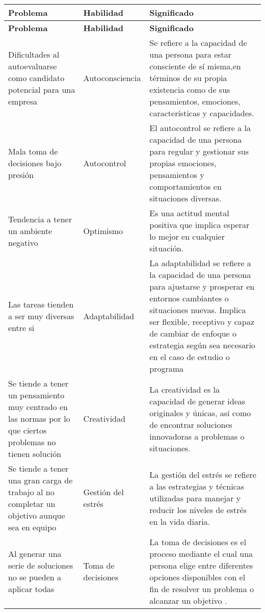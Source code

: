 \begin{longtable}{|p{6cm}|p{3cm}|p{8cm}|}
\hline
\textbf{Problema}  & \textbf{Habilidad} & \textbf{Significado}  \\ 
\hline
\endfirsthead
\hline
\textbf{Problema}  & \textbf{Habilidad} & \textbf{Significado}  \\ 
\hline
\endhead
\hline
\endfoot

Dificultades al autoevaluarse como candidato potencial para una empresa & Autoconsciencia & Se refiere a la capacidad de una persona para estar consciente de sí misma,en términos de su propia existencia como de sus pensamientos, emociones, características y capacidades.

 \\ 
 \hline
Mala toma de decisiones bajo presión
&
Autocontrol
 & 
El autocontrol se refiere a la capacidad de una persona para regular y gestionar sus propias emociones, pensamientos y comportamientos en situaciones diversas. 

\\ 
 \hline
Tendencia a tener un ambiente negativo
&
Optimismo
 & 
Es una actitud mental positiva que implica esperar lo mejor en cualquier situación. 

\\ 
\hline
Las tareas tienden a ser muy diversas entre si
&
Adaptabilidad
 & 
La adaptabilidad se refiere a la capacidad de una persona para ajustarse y prosperar en entornos cambiantes o situaciones nuevas. Implica ser flexible, receptivo y capaz de cambiar de enfoque o estrategia según sea necesario en el caso de estudio o programa
\\ 
\hline

Se tiende a tener un pensamiento muy centrado en las normas por lo que ciertos problemas no tienen solución

&
Creatividad
 & 
La creatividad es la capacidad de generar ideas originales y únicas, así como de encontrar soluciones innovadoras a problemas o situaciones.


\\
\hline
Se tiende a tener una gran carga de trabajo al no completar un objetivo aunque sea en equipo
&
Gestión del estrés
 & 
La gestión del estrés se refiere a las estrategias y técnicas utilizadas para manejar y reducir los niveles de estrés en la vida diaria.

\\
\hline
Al generar una serie de soluciones no se pueden a aplicar todas

&
 Toma de decisiones & 
La toma de decisiones es el proceso mediante el cual una persona elige entre diferentes opciones disponibles con el fin de resolver un problema o alcanzar un objetivo .


\end{longtable}
